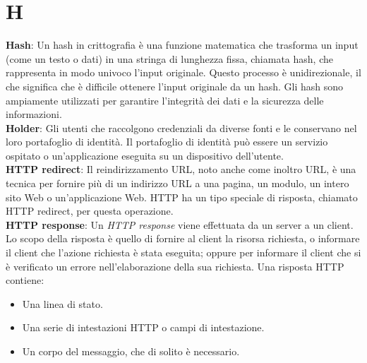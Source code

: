 \section{H}
\textbf{Hash}: Un hash in crittografia è una funzione matematica che trasforma un input (come un testo o dati) in una stringa di lunghezza fissa, chiamata hash, che rappresenta in modo univoco l'input originale. Questo processo è unidirezionale, il che significa che è difficile ottenere l'input originale da un hash. Gli hash sono ampiamente utilizzati per garantire l'integrità dei dati e la sicurezza delle informazioni.\\
\textbf{Holder}: Gli utenti che raccolgono credenziali da diverse fonti e le conservano nel loro portafoglio di identità. Il portafoglio di identità può essere un servizio ospitato o un'applicazione eseguita su un dispositivo dell'utente.\\
\textbf{HTTP redirect}: Il reindirizzamento URL, noto anche come inoltro URL, è una tecnica per fornire più di un indirizzo URL a una pagina, un modulo, un intero sito Web o un'applicazione Web. 
HTTP ha un tipo speciale di risposta, chiamato HTTP redirect, per questa operazione.\\
\textbf{HTTP response}: Un\textit{ HTTP response} viene effettuata da un server a un client. Lo scopo della risposta è quello di fornire al client la risorsa richiesta,
o informare il client che l'azione richiesta è stata eseguita; oppure per informare il client che si è verificato un errore nell'elaborazione della sua richiesta.
Una risposta HTTP contiene:
\begin{itemize}
    \item Una linea di stato.
    \item Una serie di intestazioni HTTP o campi di intestazione.
    \item Un corpo del messaggio, che di solito è necessario.
\end{itemize}
